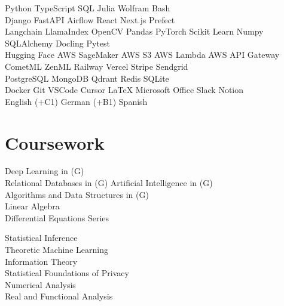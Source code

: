 \documentclass[]{tex/deedy-resume-openfont}
\begin{document}
\begin{minipage}[t]{0.32\textwidth}
Python \textbullet{} 
TypeScript \textbullet{} 
SQL \textbullet{} 
Julia \textbullet{} 
Wolfram \textbullet{} 
Bash \\[4pt]

Django \textbullet{} 
FastAPI \textbullet{} 
Airflow \textbullet{} 
React \textbullet{} 
Next.js \textbullet{} 
Prefect \\[4pt]


Langchain \textbullet{} 
LlamaIndex \textbullet{} 
OpenCV \textbullet{} 
Pandas \textbullet{} 
PyTorch \textbullet{} 
Scikit Learn \textbullet{} 
Numpy \textbullet{} 
SQLAlchemy \textbullet{} 
Docling \textbullet{} 
Pytest \\[4pt]

Hugging Face \textbullet{} 
AWS SageMaker \textbullet{} 
AWS S3 \textbullet{} 
AWS Lambda \textbullet{} 
AWS API Gateway \textbullet{} 
CometML \textbullet{} 
ZenML \textbullet{} 
Railway \textbullet{} 
Vercel \textbullet{} 
Stripe \textbullet{} 
Sendgrid \\[4pt]

PostgreSQL \textbullet{} 
MongoDB \textbullet{} 
Qdrant \textbullet{} 
Redis \textbullet{} 
SQLite \\[4pt]

Docker \textbullet{} 
Git \textbullet{} 
VSCode \textbullet{} 
Cursor \textbullet{} 
\LaTeX{} \textbullet{} 
Microsoft Office \textbullet{} 
Slack \textbullet{} 
Notion \\[6pt]

English ($+$C1) \textbullet{} German ($+$B1) \textbullet{} Spanish


\section{Coursework}
Deep Learning in (G)\\
Relational Databases in  (G)
Artificial Intelligence in  (G)\\
Algorithms and Data Structures in  (G)\\
Linear Algebra\\
Differential Equations Series\\

\sectionsep

Statistical Inference\\
Theoretic Machine Learning\\
Information Theory\\
Statistical Foundations of Privacy\\
Numerical Analysis \\
Real and Functional Analysis\\


%
%

\end{minipage} 
\end{document}
